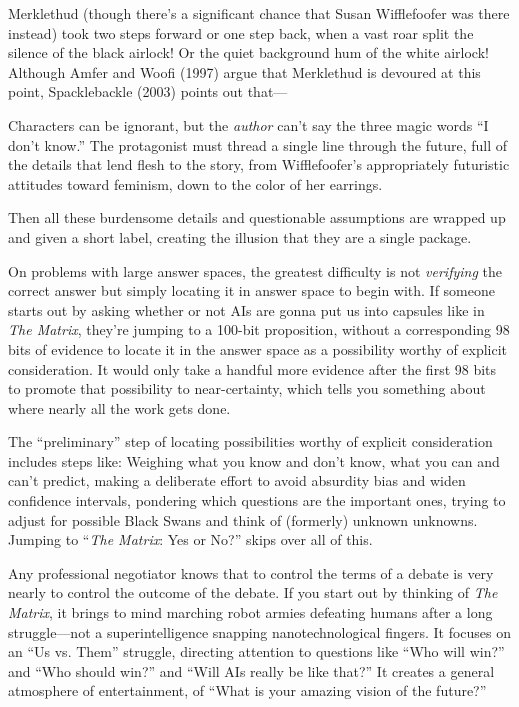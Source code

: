 {
 Merklethud (though there's a significant chance
that Susan Wifflefoofer was there instead) took two steps forward or
one step back, when a vast roar split the silence of the black airlock!
Or the quiet background hum of the white airlock! Although Amfer and
Woofi (1997) argue that Merklethud is devoured at this point,
Spacklebackle (2003) points out that---}

{
 Characters can be ignorant, but the \textit{author}
can't say the three magic words ``I
don't know.'' The protagonist must
thread a single line through the future, full of the details that lend
flesh to the story, from Wifflefoofer's appropriately
futuristic attitudes toward feminism, down to the color of her
earrings.}

{
 Then all these burdensome details and questionable assumptions are
wrapped up and given a short label, creating the illusion that they are
a single package.}

{
 On problems with large answer spaces, the greatest difficulty is
not \textit{verifying} the correct answer but simply locating it in
answer space to begin with. If someone starts out by asking whether or
not AIs are gonna put us into capsules like in \textit{The Matrix},
they're jumping to a 100-bit proposition, without a
corresponding 98 bits of evidence to locate it in the answer space as a
possibility worthy of explicit consideration. It would only take a
handful more evidence after the first 98 bits to promote that
possibility to near-certainty, which tells you something about where
nearly all the work gets done.}

{
 The ``preliminary'' step of
locating possibilities worthy of explicit consideration includes steps
like: Weighing what you know and don't know, what you
can and can't predict, making a deliberate effort to
avoid absurdity bias and widen confidence intervals, pondering which
questions are the important ones, trying to adjust for possible Black
Swans and think of (formerly) unknown unknowns. Jumping to
``\textit{The Matrix}: Yes or No?''
skips over all of this.}

{
 Any professional negotiator knows that to control the terms of a
debate is very nearly to control the outcome of the debate. If you
start out by thinking of \textit{The Matrix}, it brings to mind
marching robot armies defeating humans after a long struggle---not a
superintelligence snapping nanotechnological fingers. It focuses on an
``Us vs. Them'' struggle, directing
attention to questions like ``Who will
win?'' and ``Who should
win?'' and ``Will AIs really be like
that?'' It creates a general atmosphere of
entertainment, of ``What is your amazing vision of the
future?''}

